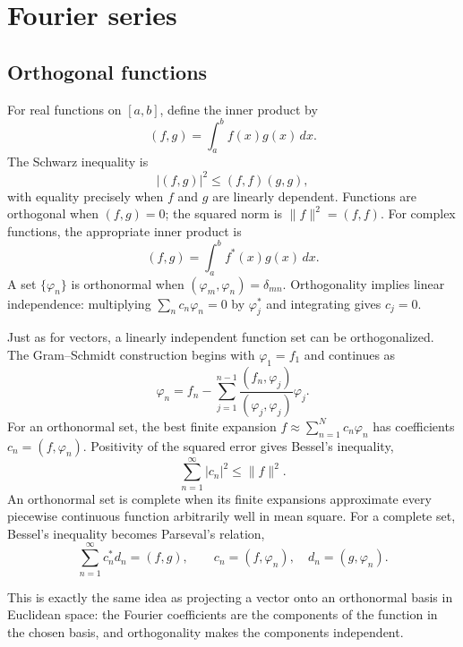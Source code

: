 \section{Fourier series}

\subsection{Orthogonal functions}

For real functions on $[a,b]$, define the inner product by
\begin{equation}
(f,g)=\int_a^b f(x)g(x)\,dx.
\end{equation}
The Schwarz inequality is
\begin{equation}
|(f,g)|^2\leq(f,f)(g,g),
\end{equation}
with equality precisely when $f$ and $g$ are linearly dependent. Functions are orthogonal when $(f,g)=0$; the squared norm is $\lVert f\rVert^2=(f,f)$. For complex functions, the appropriate inner product is
\begin{equation}
(f,g)=\int_a^b f^*(x)g(x)\,dx.
\end{equation}
A set $\{\varphi_n\}$ is orthonormal when $(\varphi_m,\varphi_n)=\delta_{mn}$. Orthogonality implies linear independence: multiplying $\sum_n c_n\varphi_n=0$ by $\varphi_j^*$ and integrating gives $c_j=0$.

Just as for vectors, a linearly independent function set can be orthogonalized. The Gram--Schmidt construction begins with $\varphi_1=f_1$ and continues as
\begin{equation}
\varphi_n=f_n-\sum_{j=1}^{n-1}
\frac{(f_n,\varphi_j)}{(\varphi_j,\varphi_j)}\varphi_j.
\end{equation}
For an orthonormal set, the best finite expansion $f\approx\sum_{n=1}^N c_n\varphi_n$ has coefficients $c_n=(f,\varphi_n)$. Positivity of the squared error gives Bessel's inequality,
\begin{equation}
\sum_{n=1}^{\infty}|c_n|^2\leq\lVert f\rVert^2.
\end{equation}
An orthonormal set is complete when its finite expansions approximate every piecewise continuous function arbitrarily well in mean square. For a complete set, Bessel's inequality becomes Parseval's relation,
\begin{equation}
\sum_{n=1}^{\infty}c_n^*d_n=(f,g),
\qquad c_n=(f,\varphi_n),\quad d_n=(g,\varphi_n).
\end{equation}

This is exactly the same idea as projecting a vector onto an orthonormal basis in Euclidean space: the Fourier coefficients are the components of the function in the chosen basis, and orthogonality makes the components independent.

